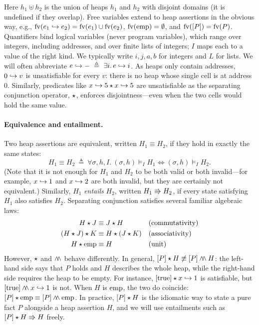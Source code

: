 Here $h_1\uplus h_2$ is the union of heaps $h_1$ and $h_2$ with disjoint domains (it is undefined
if they overlap). Free variables extend to heap assertions in the obvious way, e.g.,
$\mathrm{fv}(e_1\hookrightarrow e_2)=\mathrm{fv}(e_1)\cup\mathrm{fv}(e_2)$, $\mathrm{fv}(\mathrm{emp})=\emptyset$, and $\mathrm{fv}([P])=\mathrm{fv}(P)$.
%
Quantifiers bind logical variables (never program variables), which range over integers, including
addresses, and over finite lists of integers; $I$ maps each to a value of the right kind. We
typically write $i,j,a,b$ for integers and $L$ for lists.
%
We will often abbreviate $e\pto-\ \triangleq\ \exists i.\,e\pto i$.
%
As heaps only contain addresses, $0\hookrightarrow v$ is unsatisfiable for every $v$: there is no heap whose
single cell is at address $0$. Similarly, predicates like $x\hookrightarrow 5\mathbin{\star} x\hookrightarrow 5$ are unsatisfiable
as the separating conjunction operator, $\mathbin{\star}$, enforces disjointness---even when the two cells
would hold the same value.
%
\paragraph{Equivalence and entailment.} Two heap assertions are equivalent, written
$H_1\equiv H_2$, if they hold in exactly the same states:
\[
  H_1\equiv H_2\ \triangleq\ \forall\sigma,h,I.\ (\sigma,h)\models_I H_1\iff(\sigma,h)\models_I H_2.
\]
(Note that it is not enough for $H_1$ and $H_2$ to be both valid or both invalid---for example,
$x\hookrightarrow 1$ and $x\hookrightarrow 2$ are both invalid, but they are certainly not equivalent.) Similarly, $H_1$
\emph{entails} $H_2$, written $H_1\Rrightarrow H_2$, if every state satisfying $H_1$ also satisfies
$H_2$.
%
Separating conjunction satisfies several familiar algebraic laws:
\begin{align*}
  H\mathbin{\star} J&\equiv J\mathbin{\star} H && \text{(commutativity)}\\
  (H\mathbin{\star} J)\mathbin{\star} K&\equiv H\mathbin{\star}(J\mathbin{\star} K) && \text{(associativity)}\\
  H\mathbin{\star}\mathrm{emp}&\equiv H && \text{(unit)}
\end{align*}
However, $\mathbin{\star}$ and $\mathbin{\wedge\!\!\wedge}$ behave differently. In general,
$[P]\mathbin{\star} H\not\equiv[P]\mathbin{\wedge\!\!\wedge} H$: the left-hand side says that $P$ holds and $H$
describes the whole heap, while the right-hand side requires the heap to be empty. For instance,
$[\mathrm{true}]\mathbin{\star} x\hookrightarrow 1$ is satisfiable, but $[\mathrm{true}]\mathbin{\wedge\!\!\wedge} x\hookrightarrow 1$ is not.
When $H$ is $\mathrm{emp}$, the two do coincide: $[P]\mathbin{\star}\mathrm{emp}\equiv[P]\mathbin{\wedge\!\!\wedge}\mathrm{emp}$. In practice,
$[P]\mathbin{\star} H$ is the idiomatic way to state a pure fact $P$ alongside a heap assertion $H$, and
we will use entailments such as $[P]\mathbin{\star} H\Rrightarrow H$ freely.
%
